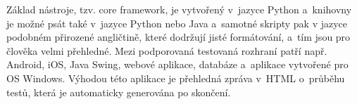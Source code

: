 \documentclass{bakalarka}
\begin{document}
	Základ nástroje, tzv. core framework, je vytvořený v~jazyce Python a~knihovny je možné psát také v~jazyce Python nebo Java a~samotné skripty pak v jazyce podobném přirozené angličtině, které dodržují jisté formátování, a~tím jsou pro člověka velmi přehledné. Mezi podporovaná testovaná rozhraní patří např. Android, iOS, Java Swing, webové aplikace, databáze a~aplikace vytvořené pro OS Windows. Výhodou této aplikace je přehledná zpráva v~HTML o~průběhu testů, která je automaticky generována po skončení.

\appendix


\end{document}

